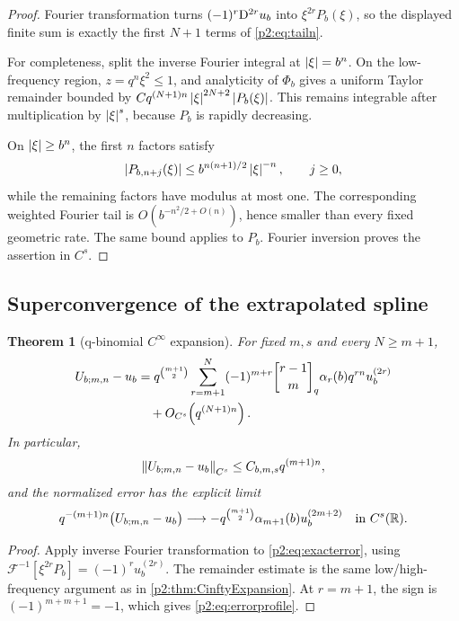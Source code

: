 \documentclass[11pt,oneside]{article}
\numberwithin{equation}{section}
\newtheorem{theorem}{Theorem}[section]
\theoremstyle{definition}
\theoremstyle{remark}
\begin{document}
\begin{proof}
Fourier transformation turns \((-1)^r\mathrm{D}^{2r}u_b\) into
\(\xi^{2r}P_b(\xi)\), so the displayed finite sum is exactly the first
\(N+1\) terms of \eqref{p2:eq:tailn}.

For completeness, split the inverse Fourier integral at \(\left\lvert \xi\right\rvert=b^n\). On the
low-frequency region, \(z=q^n\xi^2\leq1\), and analyticity of \(\Phi_b\) gives a
uniform Taylor remainder bounded by
\(Cq^{(N+1)n}\left\lvert \xi\right\rvert^{2N+2}\left\lvert P_b(\xi)\right\rvert\). This remains integrable after
multiplication by \(\left\lvert \xi\right\rvert^s\), because \(P_b\) is rapidly decreasing.

On \(\left\lvert \xi\right\rvert\geq b^n\), the first \(n\) factors satisfy
\[
 \left\lvert P_{b,n+j}(\xi)\right\rvert\leq
 b^{n(n+1)/2}\left\lvert \xi\right\rvert^{-n},\qquad j\geq0,
\]
while the remaining factors have modulus at most one. The corresponding weighted
Fourier tail is \(O(b^{-n^2/2+O(n)})\), hence smaller than every fixed geometric
rate. The same bound applies to \(P_b\). Fourier inversion proves the assertion
in \(C^s\).
\end{proof}

\subsection{Superconvergence of the extrapolated spline}

\begin{theorem}[q-binomial \(C^\infty\) expansion]
\label{p2:thm:Uexpansion}
For fixed \(m,s\) and every \(N\geq m+1\),
\begin{align}
 U_{b;m,n}-u_b
 &=q^{\binom{m+1}{2}}
 \sum_{r=m+1}^{N}(-1)^{m+r}
 \qbinomPartx{r-1}{m}\alpha_r(b)q^{rn}u_b^{(2r)}
 \notag\\
 &\quad+O_{C^s}\!\left(q^{(N+1)n}\right).
 \label{p2:eq:Uallorder}
\end{align}
In particular,
\begin{equation}
 \left\lVert U_{b;m,n}-u_b\right\rVert_{C^s}
 \leq C_{b,m,s}q^{(m+1)n},
 \label{p2:eq:Csuper}
\end{equation}
and the normalized error has the explicit limit
\begin{equation}
 q^{-(m+1)n}\bigl(U_{b;m,n}-u_b\bigr)
 \longrightarrow
 -q^{\binom{m+1}{2}}\alpha_{m+1}(b)u_b^{(2m+2)}
 \quad\text{in }C^s(\mathbb{R}).
 \label{p2:eq:errorprofile}
\end{equation}
\end{theorem}

\begin{proof}
Apply inverse Fourier transformation to \eqref{p2:eq:exacterror}, using
\(\mathcal F^{-1}[\xi^{2r}P_b]=(-1)^ru_b^{(2r)}\). The remainder estimate is
the same low/high-frequency argument as in \cref{p2:thm:CinftyExpansion}. At
\(r=m+1\), the sign is \((-1)^{m+m+1}=-1\), which gives
\eqref{p2:eq:errorprofile}.
\end{proof}
\end{document}

